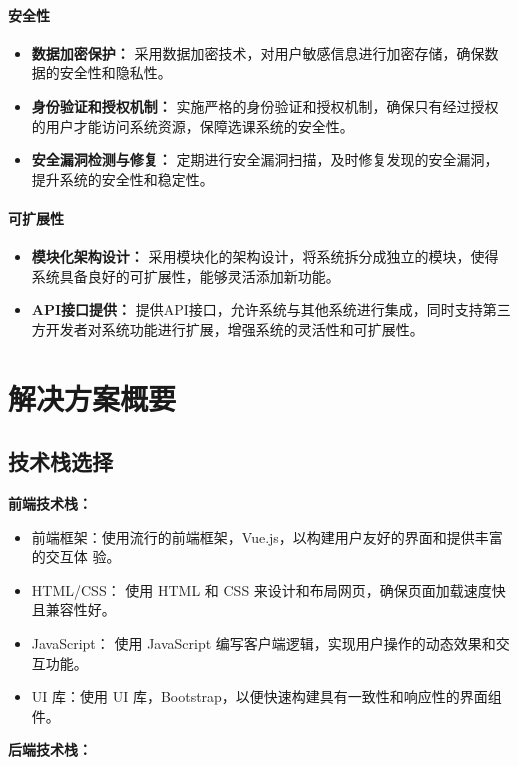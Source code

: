 \documentclass{article}
\begin{document}
\paragraph{安全性}
\begin{itemize}
	\item \textbf{数据加密保护：}  采用数据加密技术，对用户敏感信息进行加密存储，确保数据的安全性和隐私性。
	\item \textbf{身份验证和授权机制：} 实施严格的身份验证和授权机制，确保只有经过授权的用户才能访问系统资源，保障选课系统的安全性。
	\item \textbf{安全漏洞检测与修复：} 定期进行安全漏洞扫描，及时修复发现的安全漏洞，提升系统的安全性和稳定性。
\end{itemize}

\paragraph{可扩展性}
\begin{itemize}
	\item \textbf{模块化架构设计：}  采用模块化的架构设计，将系统拆分成独立的模块，使得系统具备良好的可扩展性，能够灵活添加新功能。
	\item \textbf{API接口提供：} 提供API接口，允许系统与其他系统进行集成，同时支持第三方开发者对系统功能进行扩展，增强系统的灵活性和可扩展性。
\end{itemize}

\section{解决方案概要}
\subsection{技术栈选择}
\textbf{前端技术栈：}

\begin{itemize}
	\item 前端框架：使用流行的前端框架，Vue.js，以构建用户友好的界面和提供丰富的交互体
	验。
	\item HTML/CSS： 使用 HTML 和 CSS 来设计和布局网页，确保页面加载速度快且兼容性好。
	\item JavaScript： 使用 JavaScript 编写客户端逻辑，实现用户操作的动态效果和交互功能。
	\item UI 库：使用 UI 库，Bootstrap，以便快速构建具有一致性和响应性的界面组件。
\end{itemize}

\textbf{后端技术栈：}
\end{document}
